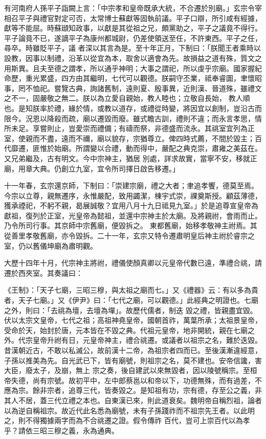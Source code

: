 \begin{pinyinscope}
 有河南府人孫平子詣闕上言：「中宗孝和皇帝既承大統，不合遷於別廟。」玄宗令宰相召平子與禮官對定可否，太常博士蘇獻等固執前議。平子口辯，所引咸有經據，獻等不能屈。時蘇頲知政事，以獻是其從祖之兄，頗黨助之，平子之議竟不得行。平子論竟不已，遂謫平子為康州都城尉，仍差使領送至任，不許東西。平子之任，尋卒。時雖貶平子，議
 者深以其言為是。至十年正月，下制曰：「朕聞王者乘時以設教，因事以制禮，沿革以從宜為本，取舍以適會為先。故損益之道有殊，質文之用斯異。且夫至德之謂孝，所以通乎神明；大事之謂祀，所以虔乎宗廟。國家握紀命歷，重光累盛，四方由其繼明，七代可以觀德。朕嗣守丕業，祗奉睿圖，聿懷昭事，罔不恤祀。嘗覽古典，詢諸舊制，遠則夏、殷事異，近則漢、晉道殊，雖禮文之不一，固嚴敬之無二。朕以為立愛自親始，教人睦也；立敬自長始，
 教人順也。是知朕率於禮，緣於情，或教以道存，或禮從時變，將因宜以創制，豈沿古而限今。況恩以降殺而疏，廟以遷毀而廢。雖式瞻古訓，禮則不違；而永言孝思，情所未足。享嘗則止，豈愛崇而禮備；有禱而祭，非德盛而流永。其祧室宜列為正室，使親而不盡，遠而不禰，廟以貌存，宗猶尊立。俾四時式薦，不間於毀主；百代靡遷，匪惟於始廟。所謂變以合禮，動而得中，嚴配之典克崇，肅雍之美茲在。又兄弟繼及，古有明文。今中宗神主，猶居
 別處，詳求故實，當寧不安，移就正廟，用章大典。仍創立九室，宜令所司擇日啟告移遷。」



 十一年春，玄宗還京師，下制曰：「崇建宗廟，禮之大者；聿追孝饗，德莫至焉。今宗以立尊，親無遷序，永惟嚴配，致用蠲潔，棟宇式崇，祼奠斯授。顧茲薄德，獲承禋祀，不躬不親，曷展誠敬？宜用八月十九日祗見九室。」於是追尊宣皇帝為獻祖，復列於正室，光皇帝為懿祖，並還中宗神主於太廟。及將親祔，會雨而止。乃令所司行事。其京師中宗舊廟，便毀拆之。
 東都舊廟，始移孝敬神主祔焉。其從善里孝敬舊廟，亦令毀拆。二十一年，玄宗又特令遷肅明皇后神主祔於睿宗之室，仍以舊儀坤廟為肅明觀。



 大歷十四年十月，代宗神主將祔，禮儀使顏真卿以元皇帝代數已遠，準禮合祧，請遷於西夾室。其奏議曰：



 《王制》：「天子七廟，三昭三穆，與太祖之廟而七。」又《禮器》云：有以多為貴者，天子七廟。」又《伊尹》曰：「七代之廟，可以觀德。」此經典之明證也。七廟之外，則曰：「去祧為壇，去壇為墠」。故歷代儒者，制迭
 毀之禮，皆親盡宜毀。伏以太宗文皇帝，七代之祖；高祖神堯皇帝，國朝首祚，萬葉所承；太祖景皇帝，受命於天，始封於唐，元本皆在不毀之典。代祖元皇帝，地非開統，親在七廟之外。代宗皇帝升祔有日，元皇帝神主，禮合祧遷。或議者以祖宗之名，難於迭毀。昔漢朝近古，不敢以私滅公，故前漢十二帝，為祖宗者四而已。至後漢漸違經意，子孫以推美為先。自光武已下，皆有廟號，則祖宗之名，莫不建也。安帝信讒，害大臣，廢太子，及崩，無上
 宗之奏，後自建武以來無毀者，因以陵號稱宗。至桓帝失德，尚有宗號。故初平中，左中郎蔡邕以和帝以下，功德無殊，而有過差，不應為宗。餘非宗者，追尊三代，皆奏毀之。是知祖有功，宗有德，存至公之義，非其人不居，蓋三代立禮之本也。自東漢已來，則此道衰矣。魏明帝自稱烈祖，論者以為逆自稱祖宗。故近代此名悉為廟號，未有子孫踐祚而不祖宗先王者。以此明之，則不得獨據兩字而為不合祧遷之證。假令傳祚
 百代，豈可上崇百代以為孝乎？請依三昭三穆之義，永為通典。




\end{pinyinscope}
